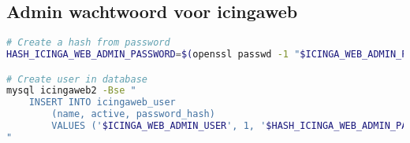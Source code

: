 \subsection{Admin wachtwoord voor icingaweb}
\begin{lstlisting}[language=bash]
# Create a hash from password
HASH_ICINGA_WEB_ADMIN_PASSWORD=$(openssl passwd -1 "$ICINGA_WEB_ADMIN_PWD")

# Create user in database
mysql icingaweb2 -Bse "
    INSERT INTO icingaweb_user
        (name, active, password_hash)
        VALUES ('$ICINGA_WEB_ADMIN_USER', 1, '$HASH_ICINGA_WEB_ADMIN_PASSWORD');
"
\end{lstlisting}
